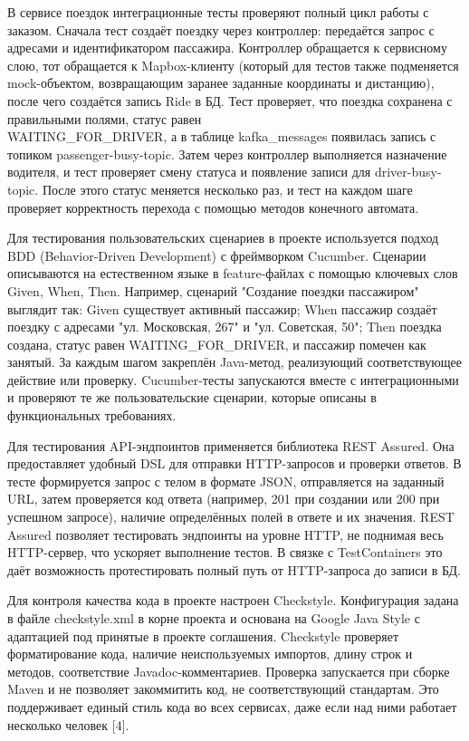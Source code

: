 {\par \redline В сервисе поездок интеграционные тесты проверяют полный цикл работы с заказом. Сначала тест создаёт поездку через контроллер: передаётся запрос с адресами и идентификатором пассажира. Контроллер обращается к сервисному слою, тот обращается к Mapbox-клиенту (который для тестов также подменяется mock-объектом, возвращающим заранее заданные координаты и дистанцию), после чего создаётся запись Ride в БД. Тест проверяет, что поездка сохранена с правильными полями, статус равен \\WAITING\_FOR\_DRIVER, а в таблице kafka\_messages появилась запись с топиком passenger-busy-topic. Затем через контроллер выполняется назначение водителя, и тест проверяет смену статуса и появление записи для driver-busy-topic. После этого статус меняется несколько раз, и тест на каждом шаге проверяет корректность перехода с помощью методов конечного автомата.

\par \redline Для тестирования пользовательских сценариев в проекте используется подход BDD (Behavior-Driven Development) с фреймворком Cucumber. Сценарии описываются на естественном языке в feature-файлах с помощью ключевых слов Given, When, Then. Например, сценарий "Создание поездки пассажиром"{} выглядит так: Given существует активный пассажир; When пассажир создаёт поездку с адресами "ул. Московская, 267"{} и "ул. Советская, 50"{}; Then поездка создана, статус равен WAITING\_FOR\_DRIVER, и пассажир помечен как занятый. За каждым шагом закреплён Java-метод, реализующий соответствующее действие или проверку. Cucumber-тесты запускаются вместе с интеграционными и проверяют те же пользовательские сценарии, которые описаны в функциональных требованиях.

\par \redline Для тестирования API-эндпоинтов применяется библиотека REST Assured. Она предоставляет удобный DSL для отправки HTTP-запросов и проверки ответов. В тесте формируется запрос с телом в формате JSON, отправляется на заданный URL, затем проверяется код ответа (например, 201 при создании или 200 при успешном запросе), наличие определённых полей в ответе и их значения. REST Assured позволяет тестировать эндпоинты на уровне HTTP, не поднимая весь HTTP-сервер, что ускоряет выполнение тестов. В связке с TestContainers это даёт возможность протестировать полный путь от HTTP-запроса до записи в БД.

\par \redline Для контроля качества кода в проекте настроен Checkstyle. Конфигурация задана в файле checkstyle.xml в корне проекта и основана на Google Java Style с адаптацией под принятые в проекте соглашения. Checkstyle проверяет форматирование кода, наличие неиспользуемых импортов, длину строк и методов, соответствие Javadoc-комментариев. Проверка запускается при сборке Maven и не позволяет закоммитить код, не соответствующий стандартам. Это поддерживает единый стиль кода во всех сервисах, даже если над ними работает несколько человек [4].

}
